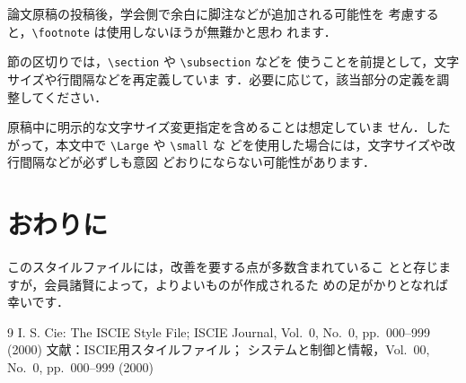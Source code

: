 \documentclass[a4paper]{article}
\begin{document}
論文原稿の投稿後，学会側で余白に脚注などが追加される可能性を
考慮すると，\verb+\footnote+ は使用しないほうが無難かと思わ
れます．

節の区切りでは，\verb+\section+ や \verb+\subsection+ などを
使うことを前提として，文字サイズや行間隔などを再定義していま
す．必要に応じて，該当部分の定義を調整してください．

原稿中に明示的な文字サイズ変更指定を含めることは想定していま
せん．したがって，本文中で \verb+\Large+ や \verb+\small+ な
どを使用した場合には，文字サイズや改行間隔などが必ずしも意図
どおりにならない可能性があります．

\section{おわりに}

このスタイルファイルには，改善を要する点が多数含まれているこ
とと存じますが，会員諸賢によって，よりよいものが作成されるた
めの足がかりとなれば幸いです．

\renewcommand{\refname}{参考文献}
\begin{thebibliography}{9}
I. S. Cie: The ISCIE Style File;
ISCIE Journal, Vol.~0, No.~0, pp.~000--999 (2000)
文献：ISCIE用スタイルファイル；
システムと制御と情報，Vol.~00, No.~0, pp.~000--999 (2000)
\end{thebibliography}
\end{document}
